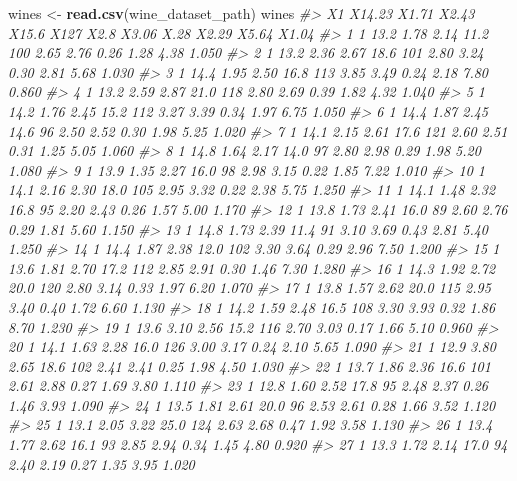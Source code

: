 \documentclass[]{book}
\newenvironment{Shaded}{\begin{snugshade}}{\end{snugshade}}
\newcommand{\CommentTok}[1]{\textcolor[rgb]{0.56,0.35,0.01}{\textit{#1}}}
\newcommand{\KeywordTok}[1]{\textcolor[rgb]{0.13,0.29,0.53}{\textbf{#1}}}
\newcommand{\NormalTok}[1]{#1}
\newcommand{\StringTok}[1]{\textcolor[rgb]{0.31,0.60,0.02}{#1}}
\begin{document}
\begin{Shaded}
\begin{Highlighting}[]
\NormalTok{wines <-}\StringTok{ }\KeywordTok{read.csv}\NormalTok{(wine_dataset_path)}
\NormalTok{wines}
\CommentTok{#>     X1 X14.23 X1.71 X2.43 X15.6 X127 X2.8 X3.06 X.28 X2.29 X5.64 X1.04}
\CommentTok{#> 1    1   13.2  1.78  2.14  11.2  100 2.65  2.76 0.26  1.28  4.38 1.050}
\CommentTok{#> 2    1   13.2  2.36  2.67  18.6  101 2.80  3.24 0.30  2.81  5.68 1.030}
\CommentTok{#> 3    1   14.4  1.95  2.50  16.8  113 3.85  3.49 0.24  2.18  7.80 0.860}
\CommentTok{#> 4    1   13.2  2.59  2.87  21.0  118 2.80  2.69 0.39  1.82  4.32 1.040}
\CommentTok{#> 5    1   14.2  1.76  2.45  15.2  112 3.27  3.39 0.34  1.97  6.75 1.050}
\CommentTok{#> 6    1   14.4  1.87  2.45  14.6   96 2.50  2.52 0.30  1.98  5.25 1.020}
\CommentTok{#> 7    1   14.1  2.15  2.61  17.6  121 2.60  2.51 0.31  1.25  5.05 1.060}
\CommentTok{#> 8    1   14.8  1.64  2.17  14.0   97 2.80  2.98 0.29  1.98  5.20 1.080}
\CommentTok{#> 9    1   13.9  1.35  2.27  16.0   98 2.98  3.15 0.22  1.85  7.22 1.010}
\CommentTok{#> 10   1   14.1  2.16  2.30  18.0  105 2.95  3.32 0.22  2.38  5.75 1.250}
\CommentTok{#> 11   1   14.1  1.48  2.32  16.8   95 2.20  2.43 0.26  1.57  5.00 1.170}
\CommentTok{#> 12   1   13.8  1.73  2.41  16.0   89 2.60  2.76 0.29  1.81  5.60 1.150}
\CommentTok{#> 13   1   14.8  1.73  2.39  11.4   91 3.10  3.69 0.43  2.81  5.40 1.250}
\CommentTok{#> 14   1   14.4  1.87  2.38  12.0  102 3.30  3.64 0.29  2.96  7.50 1.200}
\CommentTok{#> 15   1   13.6  1.81  2.70  17.2  112 2.85  2.91 0.30  1.46  7.30 1.280}
\CommentTok{#> 16   1   14.3  1.92  2.72  20.0  120 2.80  3.14 0.33  1.97  6.20 1.070}
\CommentTok{#> 17   1   13.8  1.57  2.62  20.0  115 2.95  3.40 0.40  1.72  6.60 1.130}
\CommentTok{#> 18   1   14.2  1.59  2.48  16.5  108 3.30  3.93 0.32  1.86  8.70 1.230}
\CommentTok{#> 19   1   13.6  3.10  2.56  15.2  116 2.70  3.03 0.17  1.66  5.10 0.960}
\CommentTok{#> 20   1   14.1  1.63  2.28  16.0  126 3.00  3.17 0.24  2.10  5.65 1.090}
\CommentTok{#> 21   1   12.9  3.80  2.65  18.6  102 2.41  2.41 0.25  1.98  4.50 1.030}
\CommentTok{#> 22   1   13.7  1.86  2.36  16.6  101 2.61  2.88 0.27  1.69  3.80 1.110}
\CommentTok{#> 23   1   12.8  1.60  2.52  17.8   95 2.48  2.37 0.26  1.46  3.93 1.090}
\CommentTok{#> 24   1   13.5  1.81  2.61  20.0   96 2.53  2.61 0.28  1.66  3.52 1.120}
\CommentTok{#> 25   1   13.1  2.05  3.22  25.0  124 2.63  2.68 0.47  1.92  3.58 1.130}
\CommentTok{#> 26   1   13.4  1.77  2.62  16.1   93 2.85  2.94 0.34  1.45  4.80 0.920}
\CommentTok{#> 27   1   13.3  1.72  2.14  17.0   94 2.40  2.19 0.27  1.35  3.95 1.020}

\end{Highlighting}
\end{Shaded}
\end{document}
